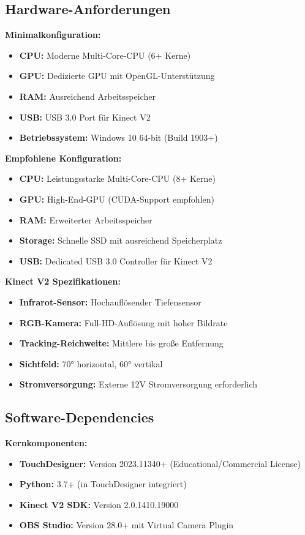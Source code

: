 \subsection{Hardware-Anforderungen}

\textbf{Minimalkonfiguration:}
\begin{itemize}
    \item \textbf{CPU:} Moderne Multi-Core-CPU (6+ Kerne)
    \item \textbf{GPU:} Dedizierte GPU mit OpenGL-Unterstützung
    \item \textbf{RAM:} Ausreichend Arbeitsspeicher
    \item \textbf{USB:} USB 3.0 Port für Kinect V2
    \item \textbf{Betriebssystem:} Windows 10 64-bit (Build 1903+)
\end{itemize}

\textbf{Empfohlene Konfiguration:}
\begin{itemize}
    \item \textbf{CPU:} Leistungsstarke Multi-Core-CPU (8+ Kerne)
    \item \textbf{GPU:} High-End-GPU (CUDA-Support empfohlen)
    \item \textbf{RAM:} Erweiterter Arbeitsspeicher
    \item \textbf{Storage:} Schnelle SSD mit ausreichend Speicherplatz
    \item \textbf{USB:} Dedicated USB 3.0 Controller für Kinect V2
\end{itemize}

\textbf{Kinect V2 Spezifikationen:}
\begin{itemize}
    \item \textbf{Infrarot-Sensor:} Hochauflösender Tiefensensor
    \item \textbf{RGB-Kamera:} Full-HD-Auflösung mit hoher Bildrate
    \item \textbf{Tracking-Reichweite:} Mittlere bis große Entfernung
    \item \textbf{Sichtfeld:} 70° horizontal, 60° vertikal
    \item \textbf{Stromversorgung:} Externe 12V Stromversorgung erforderlich
\end{itemize}

\subsection{Software-Dependencies}

\textbf{Kernkomponenten:}
\begin{itemize}
    \item \textbf{TouchDesigner:} Version 2023.11340+ (Educational/Commercial License)
    \item \textbf{Python:} 3.7+ (in TouchDesigner integriert)
    \item \textbf{Kinect V2 SDK:} Version 2.0.1410.19000
    \item \textbf{OBS Studio:} Version 28.0+ mit Virtual Camera Plugin
\end{itemize}

